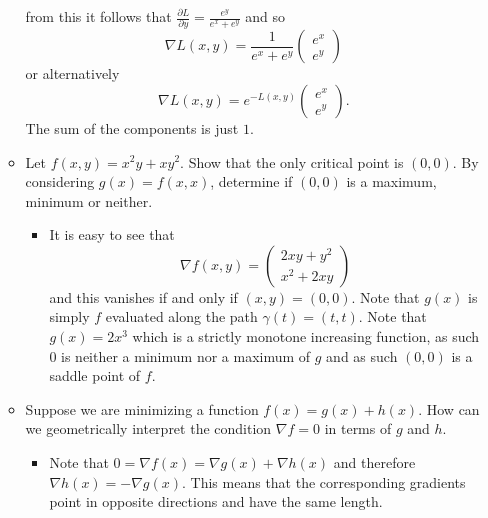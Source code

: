 \documentclass{article}
\begin{document}
\begin{enumerate}
\begin{itemize}
$$		$$
		from this it follows that $\frac{\partial L}{\partial y} = \frac{e^y}{e^x + e^y}$ and so
		$$
		\nabla L(x, y) = \frac{1}{e^x + e^y} \begin{pmatrix} e^x \\ e^y \end{pmatrix}
		$$
		or alternatively
		$$
		\nabla L(x, y) = e^{-L(x, y)} \begin{pmatrix} e^x \\ e^y \end{pmatrix}.
		$$
		The sum of the components is just $1$.
		\item Let $f(x, y) = x^2 y + x y^2$. Show that the only critical point is $(0, 0)$. By considering $g(x) = f(x, x)$, determine if $(0, 0)$ is a maximum, minimum or neither.
			\begin{itemize}
				\item It is easy to see that
				$$
				\nabla f(x, y) = \begin{pmatrix} 2xy + y^2 \\ x^2 + 2xy \end{pmatrix}
				$$
				and this vanishes if and only if $(x, y) = (0, 0)$. Note that $g(x)$ is simply $f$ evaluated along the path $\gamma(t) = (t, t)$. Note that $g(x) = 2x^3$ which is a strictly monotone increasing function, as such $0$ is neither a minimum nor a maximum of $g$ and as such $(0, 0)$ is a saddle point of $f$.
			\end{itemize}
		\item Suppose we are minimizing a function $f(x) = g(x) + h(x)$. How can we geometrically interpret the condition $\nabla f = 0$ in terms of $g$ and $h$.
			\begin{itemize}
				\item Note that $0 = \nabla f(x) = \nabla g(x) + \nabla h(x)$ and therefore $\nabla h(x) = - \nabla g(x)$. This means that the corresponding gradients point in opposite directions and have the same length.
			\end{itemize}
	\end{itemize}
\end{enumerate}
\end{document}
